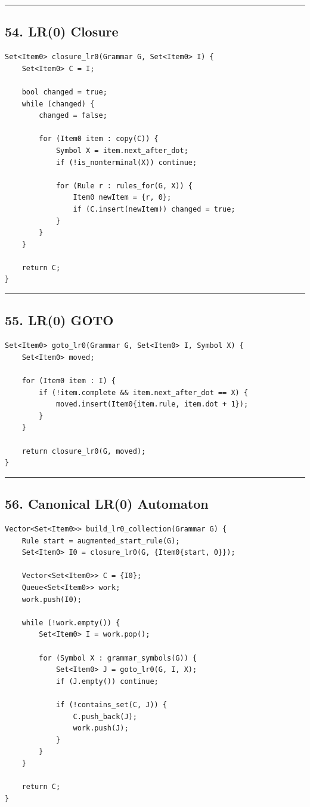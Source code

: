 \documentclass[10pt,letterpaper]{article}
\begin{document}
\medskip\hrule\medskip

\subsection*{54. LR(0) Closure}

\begin{verbatim}
Set<Item0> closure_lr0(Grammar G, Set<Item0> I) {
    Set<Item0> C = I;

    bool changed = true;
    while (changed) {
        changed = false;

        for (Item0 item : copy(C)) {
            Symbol X = item.next_after_dot;
            if (!is_nonterminal(X)) continue;

            for (Rule r : rules_for(G, X)) {
                Item0 newItem = {r, 0};
                if (C.insert(newItem)) changed = true;
            }
        }
    }

    return C;
}
\end{verbatim}

\medskip\hrule\medskip

\subsection*{55. LR(0) GOTO}

\begin{verbatim}
Set<Item0> goto_lr0(Grammar G, Set<Item0> I, Symbol X) {
    Set<Item0> moved;

    for (Item0 item : I) {
        if (!item.complete && item.next_after_dot == X) {
            moved.insert(Item0{item.rule, item.dot + 1});
        }
    }

    return closure_lr0(G, moved);
}
\end{verbatim}

\medskip\hrule\medskip

\subsection*{56. Canonical LR(0) Automaton}

\begin{verbatim}
Vector<Set<Item0>> build_lr0_collection(Grammar G) {
    Rule start = augmented_start_rule(G);
    Set<Item0> I0 = closure_lr0(G, {Item0{start, 0}});

    Vector<Set<Item0>> C = {I0};
    Queue<Set<Item0>> work;
    work.push(I0);

    while (!work.empty()) {
        Set<Item0> I = work.pop();

        for (Symbol X : grammar_symbols(G)) {
            Set<Item0> J = goto_lr0(G, I, X);
            if (J.empty()) continue;

            if (!contains_set(C, J)) {
                C.push_back(J);
                work.push(J);
            }
        }
    }

    return C;
}
\end{verbatim}
\end{document}
